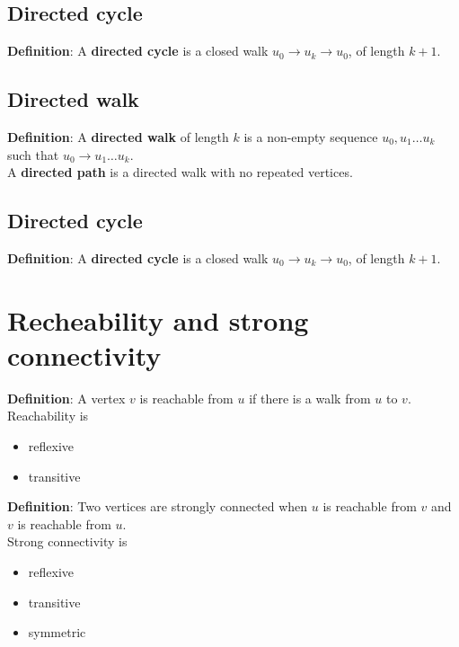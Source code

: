 \subsection{Directed cycle}
\begin{framed}
   \textbf{Definition}: A \textbf{directed cycle} is a closed walk $u_0 \rightarrow u_k \rightarrow u_0$, of length $ k + 1$. 
\end{framed}


  
\subsection{Directed walk}
\begin{framed}
   \textbf{Definition}: A \textbf{directed walk} of length $k$ is a non-empty sequence $u_0, u_1 \hdots u_k$ such that $u_0 \rightarrow u_1 \hdots u_k$. \\

   A \textbf{directed path} is a directed walk with no repeated vertices. 
\end{framed}

\subsection{Directed cycle}
\begin{framed}
   \textbf{Definition}: A \textbf{directed cycle} is a closed walk $u_0 \rightarrow u_k \rightarrow u_0$, of length $ k + 1$. 
\end{framed}

\section{Recheability and strong connectivity}

\begin{framed}
   \textbf{Definition}: A vertex $v$ is reachable from $u$ if there is a walk from $u $ to $v$. \\

   Reachability is
   \begin{itemize}
      \item reflexive
      \item transitive
   \end{itemize}
\end{framed}

\begin{framed}
   \textbf{Definition}: Two vertices are strongly connected when $u $ is reachable from $v$ and $v$ is reachable from $u$. \\

   Strong connectivity is 
   \begin{itemize}
      \item reflexive
      \item transitive
      \item symmetric
   \end{itemize}
\end{framed}

